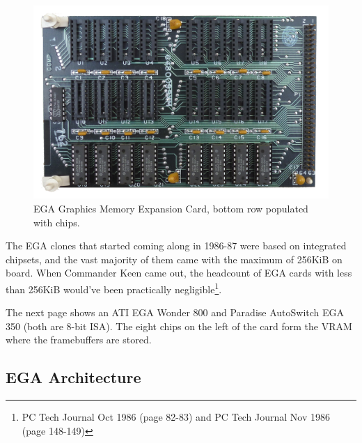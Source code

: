 \documentclass[book.tex]{subfiles}
\begin{document}
\begin{figure}[H]
  \centering 
  \includegraphics[width=1.0\textwidth]{screenshots_300dpi/hardware/ibm_ega_graphics_memory_expansion_card.png} 
  \caption{EGA Graphics Memory Expansion Card, bottom row populated with chips.}
  \label{fig:ibm_ega_card}
\end{figure}






\par
The EGA clones that started coming along in 1986-87 were based on integrated chipsets, and the vast majority of them came with the maximum of 256KiB on board. When Commander Keen came out, the headcount of EGA cards with less than 256KiB would've been practically negligible\footnote{PC Tech Journal Oct 1986 (page 82-83) and PC Tech Journal Nov 1986 (page 148-149)}.\\

\par
The next page shows an ATI EGA Wonder 800 and Paradise AutoSwitch EGA 350 (both are 8-bit ISA). The eight chips on the left of the card form the VRAM where the framebuffers are stored. 

\begin{figure}[H] 
  \centering 
\end{figure}
\begin{figure}[H] 
  \centering 
\end{figure}
\pagebreak




\subsection{EGA Architecture}
\end{document}
